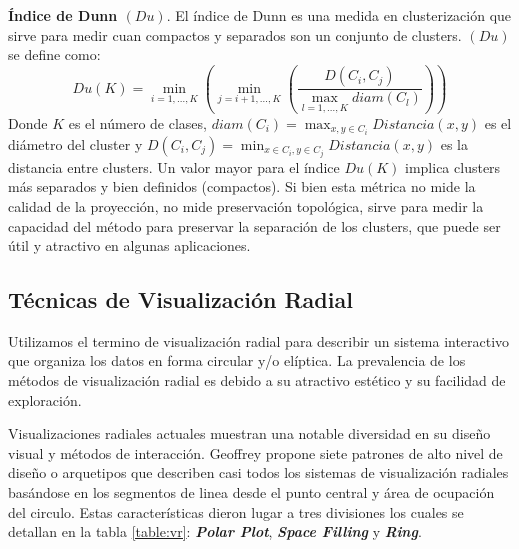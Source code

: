 \textbf{Índice de Dunn $(Du)$}. El índice de Dunn \cite{xu2009clustering} es una medida en clusterización que sirve para medir cuan compactos y separados son un conjunto de clusters. $(Du)$ se define como:
\begin{equation}
Du(K)=\min_{i=1,\ldots,K}\left(\min_{j=i+1,\ldots,K}\left(\frac{D(C_i,C_j)}{\max_{l=1,\ldots,K}diam(C_l)}\right)\right)
\end{equation} 
Donde $K$ es el número de clases, $diam(C_i)=\max_{x,y\in C_i}Distancia(x,y)$ es el diámetro del cluster y $D(C_i,C_j)=\min_{x\in C_{i},y\in C_{j}}Distancia(x,y)$ es la distancia entre clusters.
Un valor mayor para el índice $Du(K)$ implica clusters más separados y bien definidos (compactos). Si bien esta métrica no mide la calidad de la proyección, no mide preservación topológica, sirve para medir la capacidad del método para preservar la separación de los clusters, que puede ser útil y atractivo en algunas aplicaciones. 

\subsection{Técnicas de Visualización Radial}
Utilizamos el termino de visualización radial para describir un sistema interactivo que organiza los datos en forma circular y/o elíptica. La prevalencia de los métodos de visualización radial es debido a su atractivo estético y su facilidad de exploración.

Visualizaciones radiales actuales muestran una notable diversidad en su diseño visual y métodos de interacción. Geoffrey \cite{draper2009survey} propone siete patrones de alto nivel de diseño o arquetipos que describen casi todos los sistemas de visualización radiales basándose en los segmentos de linea desde el punto central y área de ocupación del circulo. Estas características dieron lugar a tres divisiones los cuales se detallan en la tabla \ref{table:vr}: \textbf{\textit{Polar Plot}}, \textbf{\textit{Space Filling}} y \textbf{\textit{Ring}}.

